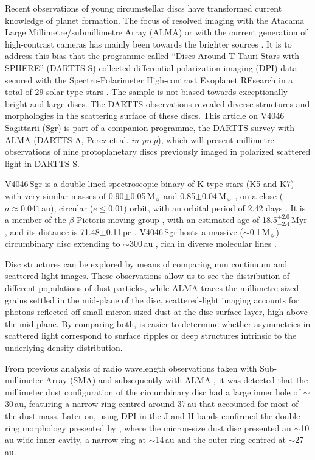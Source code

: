 \documentclass[fleqn,usenatbib,useAMS]{mnras}
\begin{document}
Recent observations of young circumstellar discs have transformed current knowledge of planet formation. The focus of resolved imaging with the Atacama Large Millimetre/submillimetre Array (ALMA) or with the current generation of high-contrast cameras has mainly been towards the brighter sources \citep[e.g.][]{2020ARA&A..58..483A}. It is to address this bias that the programme called ``Discs Around T Tauri Stars with SPHERE'' (DARTTS-S) collected differential polarization imaging (DPI) data secured with the Spectro-Polarimeter High-contrast Exoplanet REsearch \citep[SPHERE][]{2019A&A...631A.155B} in a total of 29 solar-type stars \citep[][]{Avenhaus_2018,Garufi2020}. The sample is not biased towards exceptionally bright and large discs. The DARTTS observations revealed diverse structures and morphologies in the scattering surface of these discs. This article on V4046 Sagittarii (Sgr) is part of a companion programme, the DARTTS survey with ALMA (DARTTS-A, Perez et al. {\em in prep}), which will present millimetre observations of nine protoplanetary discs previously imaged in polarized scattered light in DARTTS-S.

V4046\,Sgr is a double-lined spectroscopic binary of K-type stars (K5 and K7) with very similar masses of 0.90$\pm$0.05\,M$_{\sun}$ and 0.85$\pm$0.04\,M$_{\sun}$ \citep{Rosenfeld_2012}, on a close ($a \approx 0.041$\,au), circular ($e\leq0.01$) orbit, with an orbital period of 2.42 days \citep{2000IAUS..200P..28Q}. It is a member of the $\beta$ Pictoris moving group \citep{Zuckerman_2004}, with an estimated age of 18.5$^{+2.0}_{-2.4}$\,Myr \citep{2020A&A...642A.179M}, and its distance is 71.48$\pm$0.11\,pc \citep{gaiacollaboration2020gaia}. V4046\,Sgr hosts a massive ($\sim$0.1\,M$_{\sun}$) circumbinary disc extending to $\sim$300\,au \citep{Rosenfeld_2013, Rodriguez_2010}, rich in diverse molecular lines \citep{Kastner_2018}.

Disc structures can be explored by means of comparing mm continuum and scattered-light images. These observations allow us to see the distribution of different populations of dust particles, while ALMA traces the millimetre-sized grains settled in the mid-plane of the disc, scattered-light imaging accounts for photons reflected off small micron-sized dust at the disc surface layer, high above the mid-plane. By comparing both, is easier to determine whether asymmetries in scattered light correspond to surface ripples or deep structures intrinsic to the underlying density distribution.

From previous analysis of radio wavelength observations taken with Sub-millimeter Array (SMA) \citep{Rapson_2015} and subsequently with ALMA \citep{Guzman_2017,Huang_2017,Bergner_2018,Kastner_2018}, it was detected that the millimeter dust configuration of the circumbinary disc had a large inner hole of $\sim$30\,au, featuring a narrow ring centred around 37\,au that accounted for most of the dust mass. Later on, \citet{Avenhaus_2018} using DPI in the J and H bands confirmed the double-ring morphology presented by \citet{Rapson_2015}, where the micron-size dust disc presented an $\sim$10\,au-wide inner cavity, a narrow ring at $\sim$14\,au and the outer ring centred at $\sim$27\,au.
\end{document}
